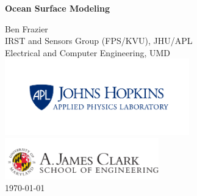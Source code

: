 \documentclass[12pt,letterpaper,twoside]{article}
\numberwithin{equation}{section}
\numberwithin{figure}{section}
\numberwithin{table}{section}
\begin{document}
\titlepage
\begin{center}
\vspace*{25pt}
{\huge \bfseries Ocean Surface Modeling\\}

\vspace{150 pt}

\large Ben Frazier \\
 \small IRST and Sensors Group (FPS/KVU), JHU/APL \\
 \small Electrical and Computer Engineering, UMD \\
\includegraphics[width=0.6\textwidth]{../media/apl_small_horizontal_blue} \\
\includegraphics[width=0.5\textwidth]{../media/clark}\\
\vspace{75pt}
\large \today
\end{center}

\renewcommand{\baselinestretch}{1}
\small\normalsize
\tableofcontents %
\newpage
\listoffigures %
\newpage
\listoftables%
\newpage


\setcounter{page}{1}



\newpage
 

\end{document}
